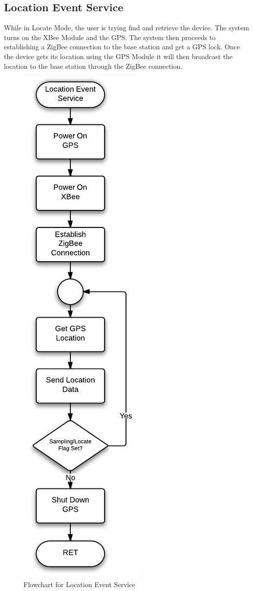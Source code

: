 \subsection{Location Event Service}
While in Locate Mode, the user is trying find and retrieve the device. The system turns on the XBee Module and the GPS. The system then proceeds to establishing a ZigBee connection to the base station and get a GPS lock. Once the device gets its location using the GPS Module it will then broadcast the location to the base station through the ZigBee connection.
\begin{figure}[H]
	\centering
	\includegraphics[scale=0.8]{img/LocationEventService}
	\caption{Flowchart for Location Event Service \label{fig:locateMode}}
\end{figure}

